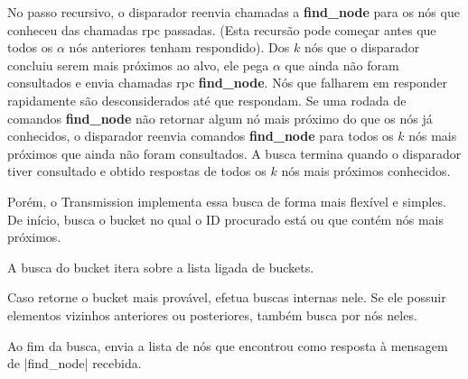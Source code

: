 \begin{itemize}
{No passo recursivo, o disparador reenvia chamadas a \textbf{find\_node} para os nós que
conheceu das chamadas \gls*{rpc} passadas. (Esta recursão pode começar antes que todos
os $\alpha$ nós anteriores tenham respondido). Dos $k$ nós que o disparador concluiu
serem mais próximos ao alvo, ele pega $\alpha$ que ainda não foram consultados e envia
chamadas \gls*{rpc} \textbf{find\_node}. Nós que falharem em responder rapidamente são
desconsiderados até que respondam. Se uma rodada de comandos \textbf{find\_node} não
retornar algum nó mais próximo do que os nós já conhecidos, o disparador reenvia
comandos \textbf{find\_node} para todos os $k$ nós mais próximos que ainda não foram
consultados. A busca termina quando o disparador tiver consultado e obtido respostas de
todos os $k$ nós mais próximos conhecidos.}

Porém, o Transmission implementa essa busca de forma mais flexível e simples. De início,
busca o \gls*{bucket} no qual o ID procurado está ou que contém nós mais próximos.


A busca do \gls*{bucket} itera sobre a lista ligada de \glspl*{bucket}.


Caso retorne o \gls*{bucket} mais provável, efetua buscas internas nele. Se ele possuir
elementos vizinhos anteriores ou posteriores, também busca por nós neles.


Ao fim da busca, envia a lista de nós que encontrou como resposta à mensagem de
\bverb|find_node| recebida.

\begin{comment}
When a node wants to find peers for a torrent, it uses the distance metric to compare
the infohash of the torrent with the IDs of the nodes in its own routing table. It then
contacts the nodes it knows about with IDs closest to the infohash and asks them for the
contact information of peers currently downloading the torrent. If a contacted node
knows about peers for the torrent, the peer contact information is returned with the
response. Otherwise, the contacted node must respond with the contact information of
the nodes in its routing table that are closest to the infohash of the torrent. The
original node iteratively queries nodes that are closer to the target infohash until it
cannot find any closer nodes. After the search is exhausted, the client then inserts
the peer contact information for itself onto the responding nodes with IDs closest to
the infohash of the torrent.


\end{comment}
\end{itemize}
